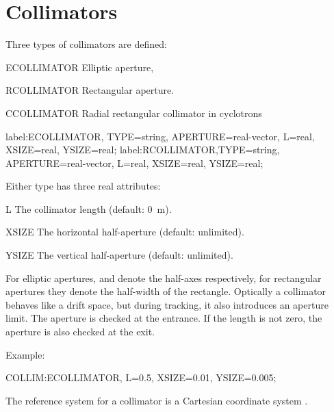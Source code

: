

\clearpage
\section{Collimators}
\label{sec:collimators}
Three types of collimators are defined:
\begin{kdescription}
\item[ECOLLIMATOR]
  \label{sec:ecollimator}
  Elliptic aperture,
\item[RCOLLIMATOR]
  \label{sec:rcollimator}
  Rectangular aperture.
\item[CCOLLIMATOR]
   Radial rectangular collimator in cyclotrons

\end{kdescription}
\begin{example}
label:ECOLLIMATOR, TYPE=string, APERTURE=real-vector,
      L=real, XSIZE=real, YSIZE=real;
label:RCOLLIMATOR,TYPE=string, APERTURE=real-vector,
      L=real, XSIZE=real, YSIZE=real;
\end{example}
Either type has three real attributes:
\begin{kdescription}
\item[L]
  The collimator length (default: 0~m).
\item[XSIZE]
  The horizontal half-aperture (default: unlimited).
\item[YSIZE]
  The vertical half-aperture (default: unlimited).
\end{kdescription}
For elliptic apertures,
 and  denote the half-axes respectively,
for rectangular apertures they denote the half-width of the rectangle.
Optically a collimator behaves like a drift space, but during tracking,
it also introduces an aperture limit.
The aperture is checked at the entrance.
If the length is not zero, the aperture is also checked at the exit.

\noindent Example:
\begin{example}
COLLIM:ECOLLIMATOR, L=0.5, XSIZE=0.01, YSIZE=0.005;
\end{example}
The reference system for a collimator is a Cartesian coordinate system
.


